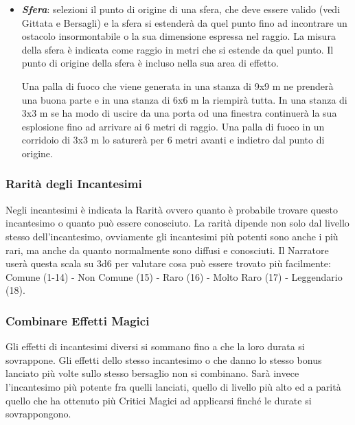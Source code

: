 \begin{multicols}{2}
\begin{itemize}[leftmargin=*]
\item \emph{\textbf{Sfera}}: selezioni il punto di origine di una sfera, che deve essere valido (vedi Gittata e Bersagli) e la sfera si estenderà da quel punto fino ad incontrare un ostacolo insormontabile o la sua dimensione espressa nel raggio. La misura della sfera è indicata come raggio in metri che si estende da quel punto. Il punto di origine della sfera è incluso nella sua area di effetto.

Una palla di fuoco che viene generata in una stanza di 9x9 m ne prenderà una buona parte e in una stanza di 6x6 m la riempirà tutta. In una stanza di 3x3 m se ha modo di uscire da una porta od una finestra continuerà la sua esplosione fino ad arrivare ai 6 metri di raggio. Una palla di fuoco in un corridoio di 3x3 m lo saturerà per 6 metri avanti e indietro dal punto di origine.

\end{itemize}

\subsubsection{Rarità degli Incantesimi}\label{magieraritaincantesimi}

Negli incantesimi è indicata la Rarità ovvero quanto è probabile trovare questo incantesimo o quanto può essere conosciuto. La rarità dipende non solo dal livello stesso dell'incantesimo, ovviamente gli incantesimi più potenti sono anche i più rari, ma anche da quanto normalmente sono diffusi e conosciuti. Il Narratore userà questa scala su 3d6 per valutare cosa può essere trovato più facilmente: %
Comune (1-14) - Non Comune (15) - Raro (16) - Molto Raro (17) - Leggendario (18).

\subsubsection{Combinare Effetti Magici}\label{magiecombinareeffettimagici}

Gli effetti di incantesimi diversi si sommano fino a che la loro durata si sovrappone. Gli effetti dello stesso incantesimo o che danno lo stesso bonus lanciato più volte sullo stesso bersaglio non si combinano. Sarà invece l'incantesimo più potente fra quelli lanciati, quello di livello più alto ed a parità quello che ha ottenuto più Critici Magici ad applicarsi finché le durate si sovrappongono.


\end{multicols}
